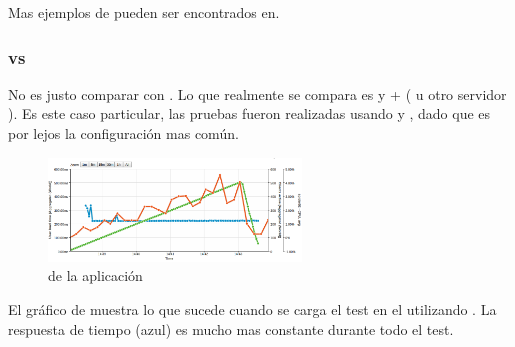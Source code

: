 
Mas ejemplos de \benchmarkQA pueden ser encontrados en\cite{online_nodejs_java_dzone}.


\subsubsection{\nodejsNAME vs \phpNAME \cite{online_nodejs_php_loadimpact}}

No es justo comparar \nodejsNAME con \phpNAME. Lo que realmente se compara es \nodejsNAME y \phpNAME + \apacheDosNAME ( u otro servidor \httpNAME ). Es este caso particular, las pruebas fueron realizadas usando \apacheDosNAME y \modPhpNAME, dado que es por lejos la configuración mas común. 

\begin{figure}[h!]
	\centering
	\includegraphics[width=0.6\textwidth]{figuras/cap2/node_benchmak_loadimpact.png}
	\caption{\performanceQA de la aplicación \nodejsNAME}
	\label{figure:node_benchmark_nodephp}
\end{figure}

El gráfico de  muestra lo que sucede cuando se carga el test en el \serverAS utilizando \nodejsNAME. La respuesta de tiempo (azul) es mucho mas constante durante todo el test. 

